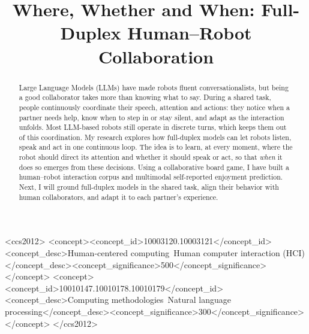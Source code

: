 \documentclass[sigconf,review,anonymous,nonacm]{acmart}
\begin{document}
\raggedbottom
\title{Where, Whether and When: Full-Duplex Human--Robot Collaboration}

\begin{abstract}
Large Language Models (LLMs) have made robots fluent conversationalists, but being a good collaborator takes more than knowing what to say. During a shared task, people continuously coordinate their speech, attention and actions: they notice when a partner needs help, know when to step in or stay silent, and adapt as the interaction unfolds. Most LLM-based robots still operate in discrete turns, which keeps them out of this coordination. My research explores how full-duplex models can let robots listen, speak and act in one continuous loop. The idea is to learn, at every moment, where the robot should direct its attention and whether it should speak or act, so that \emph{when} it does so emerges from these decisions. Using a collaborative board game, I have built a human--robot interaction corpus and multimodal self-reported enjoyment prediction. Next, I will ground full-duplex models in the shared task, align their behavior with human collaborators, and adapt it to each partner's experience.
\end{abstract}

\begin{CCSXML}
<ccs2012>
 <concept><concept_id>10003120.10003121</concept_id><concept_desc>Human-centered computing~Human computer interaction (HCI)</concept_desc><concept_significance>500</concept_significance></concept>
 <concept><concept_id>10010147.10010178.10010179</concept_id><concept_desc>Computing methodologies~Natural language processing</concept_desc><concept_significance>300</concept_significance></concept>
</ccs2012>
\end{CCSXML}
\end{document}
